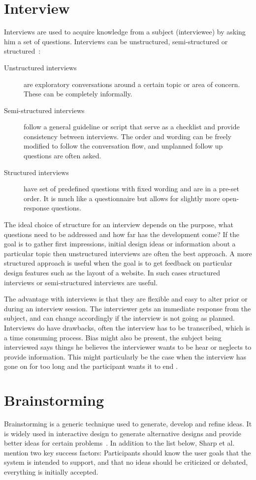 \section{Interview}
Interviews are used to acquire knowledge from a subject (interviewee) by asking him a set of questions. Interviews can be unstructured, semi-structured or structured~\cite{interactionDesign}:
\begin{description}
  \item[Unstructured interviews] are exploratory conversations around a certain topic or area of concern. These can be completely informally.
  \item[Semi-structured interviews] follow a general guideline or script that serve as a checklist and provide consistency between interviews. The order and wording can be freely modified to follow the conversation flow, and unplanned follow up questions are often asked.
  \item[Structured interviews] have set of predefined questions with fixed wording and are in a pre-set order. It is much like a questionnaire but allows for slightly more open-response questions.
\end{description}

The ideal choice of structure for an interview depends on the purpose, what questions need to be addressed and how far has the development come? If the goal is to gather first impressions, initial design ideas or information about a particular topic then unstructured interviews are often the best approach. A more structured approach is useful when the goal is to get feedback on particular design features such as the layout of a website. In such cases structured interviews or semi-structured interviews are useful.

The advantage with interviews is that they are flexible and easy to alter prior or during an interview session. The interviewer gets an immediate response from the subject, and can change accordingly if the interview is not going as planned. Interviews do have drawbacks, often the interview has to be transcribed, which is a time consuming process. Bias might also be present, the subject being interviewed says things he believes the interviewer wants to be hear or neglects to provide information. This might particularly be the case when the interview has gone on for too long and the participant wants it to end \cite{realWorldResearch}.

\section{Brainstorming}
\label{sec:brainstorming}
Brainstorming is a generic technique used to generate, develop and refine ideas. It is widely used in interactive design to generate alternative designs and provide better ideas for certain problems~\cite{interactionDesign}. In addition to the list below, Sharp et al.~\cite{interactionDesign} mention two key success factors: Participants should know the user goals that the system is intended to support, and that no ideas should be criticized or debated, everything is initially accepted.


